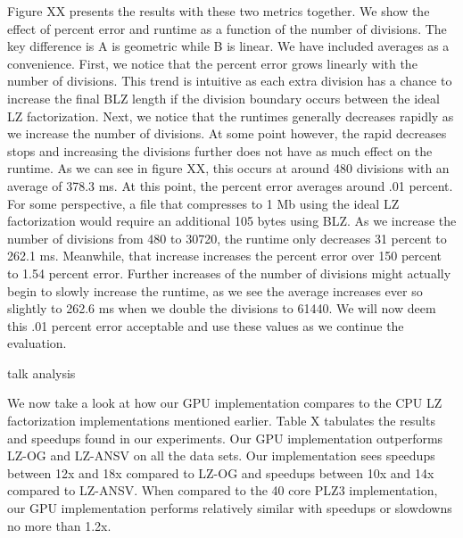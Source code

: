 Figure XX presents the results with these two metrics together.
We show the effect of percent error and runtime as a function of the number of divisions.
The key difference is A is geometric while B is linear.
We have included averages as a convenience.
First, we notice that the percent error grows linearly with the number of divisions.
This trend is intuitive as each extra division has a chance to increase the final BLZ length if the division boundary occurs between the ideal LZ factorization.
Next, we notice that the runtimes generally decreases rapidly as we increase the number of divisions.
At some point however, the rapid decreases stops and increasing the divisions further does not have as much effect on the runtime.
As we can see in figure XX, this occurs at around 480 divisions with an average of 378.3 ms.
At this point, the percent error averages around .01 percent.
For some perspective, a file that compresses to 1 Mb using the ideal LZ factorization would require an additional 105 bytes using BLZ.
As we increase the number of divisions from 480 to 30720, the runtime only decreases 31 percent to 262.1 ms.
Meanwhile, that increase increases the percent error over 150 percent to 1.54 percent error.
Further increases of the number of divisions might actually begin to slowly increase the runtime, as we see the average increases ever so slightly to 262.6 ms when we double the divisions to 61440.
We will now deem this .01 percent error acceptable and use these values as we continue the evaluation.

talk analysis

We now take a look at how our GPU implementation compares to the CPU LZ factorization implementations mentioned earlier.
Table X tabulates the results and speedups found in our experiments.
Our GPU implementation outperforms LZ-OG and LZ-ANSV on all the data sets.
Our implementation sees speedups between 12x and 18x compared to LZ-OG and speedups between 10x and 14x compared to LZ-ANSV.
When compared to the 40 core PLZ3 implementation, our GPU implementation performs relatively similar with speedups or slowdowns no more than 1.2x.

